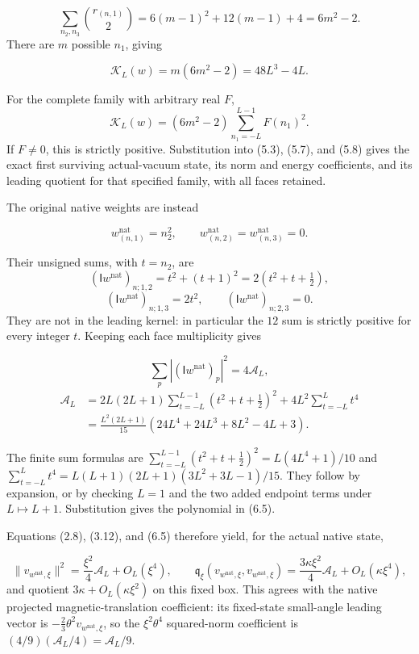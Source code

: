 \documentclass[
  11pt,
]{article}
\begin{document}
\[
\sum_{n_2,n_3}\binom{r_{(n,1)}}2
=6(m-1)^2+12(m-1)+4=6m^2-2.
\] There are \(m\) possible \(n_1\), giving

\[
\boxed{\mathcal K_L(w)=m(6m^2-2)=48L^3-4L.}
\tag{6.1}
\]

For the complete family with arbitrary real \(F\), \[
\mathcal K_L(w)=(6m^2-2)\sum_{n_1=-L}^{L-1}F(n_1)^2.
\tag{6.2}
\] If \(F\ne0\), this is strictly positive. Substitution into (5.3),
(5.7), and (5.8) gives the exact first surviving actual-vacuum state,
its norm and energy coefficients, and its leading quotient for that
specified family, with all faces retained.

The original native weights are instead

\[
w^{\mathrm{nat}}_{(n,1)}=n_2^2,\qquad
w^{\mathrm{nat}}_{(n,2)}=w^{\mathrm{nat}}_{(n,3)}=0.
\tag{6.3}
\]

Their unsigned sums, with \(t=n_2\), are \[
(\mathsf Iw^{\mathrm{nat}})_{n;1,2}=t^2+(t+1)^2=2(t^2+t+\tfrac12),
\] \[
(\mathsf Iw^{\mathrm{nat}})_{n;1,3}=2t^2,\qquad
(\mathsf Iw^{\mathrm{nat}})_{n;2,3}=0.
\tag{6.4}
\] They are not in the leading kernel: in particular the \(12\) sum is
strictly positive for every integer \(t\). Keeping each face
multiplicity gives

\[
\sum_p|(\mathsf Iw^{\mathrm{nat}})_p|^2=4\mathcal A_L,
\] \[
\begin{split}
\mathcal A_L
&=2L(2L+1)\sum_{t=-L}^{L-1}(t^2+t+\tfrac12)^2+
4L^2\sum_{t=-L}^{L}t^4\\
&=\frac{L^2(2L+1)}{15}(24L^4+24L^3+8L^2-4L+3).
\end{split}
\tag{6.5}
\]

The finite sum formulas are
\(\sum_{t=-L}^{L-1}(t^2+t+\tfrac12)^2=L(4L^4+1)/10\) and
\(\sum_{t=-L}^{L}t^4=L(L+1)(2L+1)(3L^2+3L-1)/15\). They follow by
expansion, or by checking \(L=1\) and the two added endpoint terms under
\(L\mapsto L+1\). Substitution gives the polynomial in (6.5).

Equations (2.8), (3.12), and (6.5) therefore yield, for the actual
native state,

\[
\|v_{w^{\mathrm{nat}},\xi}\|^2=\frac{\xi^2}{4}\mathcal A_L+O_L(\xi^4),
\qquad
\mathfrak q_\xi(v_{w^{\mathrm{nat}},\xi},v_{w^{\mathrm{nat}},\xi})
=\frac{3\kappa\xi^2}{4}\mathcal A_L+O_L(\kappa\xi^4),
\tag{6.6}
\] and quotient \(3\kappa+O_L(\kappa\xi^2)\) on this fixed box. This
agrees with the native projected magnetic-translation coefficient: its
fixed-state small-angle leading vector is
\(-\tfrac23\theta^2v_{w^{\mathrm{nat}},\xi}\), so the \(\xi^2\theta^4\)
squared-norm coefficient is \((4/9)(\mathcal A_L/4)=\mathcal A_L/9\).
\end{document}
